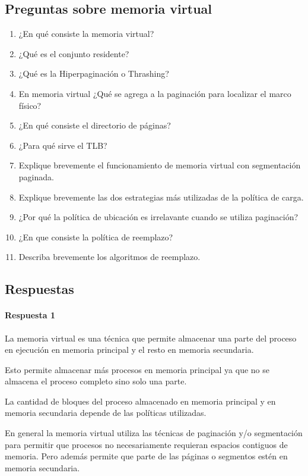 \subsection{Preguntas sobre memoria virtual}

\begin{enumerate}
  \item ¿En qué consiste la memoria virtual?
  \item ¿Qué es el conjunto residente?
  \item ¿Qué es la Hiperpaginación o Thrashing?
  \item En memoria virtual ¿Qué se agrega a la paginación para localizar el marco físico?
  \item ¿En qué consiste el directorio de páginas?
  \item ¿Para qué sirve el TLB?
  \item Explique brevemente el funcionamiento de memoria virtual con segmentación paginada.
  \item Explique brevemente las dos estrategias más utilizadas de la política de carga.
  \item ¿Por qué la política de ubicación es irrelavante cuando se utiliza paginación?
  \item ¿En que consiste la política de reemplazo?
  \item Describa brevemente los algoritmos de reemplazo.
\end{enumerate}

\subsection*{Respuestas}

\paragraph{Respuesta 1}
La memoria virtual es una técnica que permite almacenar una parte del proceso en ejecución en memoria principal y el resto en memoria secundaria.

Esto permite almacenar más procesos en memoria principal ya que no se almacena el proceso completo sino solo una parte.

La cantidad de bloques del proceso almacenado en memoria principal y en memoria secundaria depende de las políticas utilizadas.

En general la memoria virtual utiliza las técnicas de paginación y/o segmentación para permitir que procesos no necesariamente requieran espacios contiguos de memoria. Pero además permite que parte de las páginas o segmentos estén en memoria secundaria.

